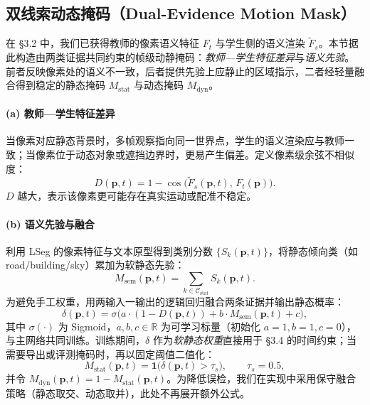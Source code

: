 \documentclass[10pt,conference]{IEEEtran} %
\begin{document}
\subsection{双线索动态掩码（Dual\mbox{-}Evidence Motion Mask）}
在 §3.2 中，我们已获得教师的像素语义特征 $F_t$ 与学生侧的语义渲染 $\tilde F_s$。本节据此构造由两类证据共同约束的帧级动静掩码：\emph{教师—学生特征差异}与\emph{语义先验}。前者反映像素处的语义不一致，后者提供先验上应静止的区域指示，二者经轻量融合得到稳定的静态掩码 $M_{\mathrm{stat}}$ 与动态掩码 $M_{\mathrm{dyn}}$。

\paragraph{(a) 教师—学生特征差异}
当像素对应静态背景时，多帧观察指向同一世界点，学生的语义渲染应与教师一致；当像素位于动态对象或遮挡边界时，更易产生偏差。定义像素级余弦不相似度：
\begin{equation}
D(\mathbf p,t)=1-\cos\!\big(\tilde F_s(\mathbf p,t),\,F_t(\mathbf p)\big).
\end{equation}
$D$ 越大，表示该像素更可能存在真实运动或配准不稳定。

\paragraph{(b) 语义先验与融合}
利用 LSeg 的像素特征与文本原型得到类别分数 $\{S_k(\mathbf p,t)\}$，将静态倾向类（如 road/building/sky）累加为软静态先验：
\begin{equation}
M_{\mathrm{sem}}(\mathbf p,t)=\sum_{k\in\mathcal C_{\mathrm{stat}}}S_k(\mathbf p,t).
\label{eq:demm_sem}
\end{equation}
为避免手工权重，用两输入一输出的逻辑回归融合两条证据并输出静态概率：
\begin{equation}
\delta(\mathbf p,t)=\sigma\!\big(a\cdot(1-D(\mathbf p,t))+b\cdot M_{\mathrm{sem}}(\mathbf p,t)+c\big),
\label{eq:demm_delta_final}
\end{equation}
其中 $\sigma(\cdot)$ 为 Sigmoid，$a,b,c\in\mathbb{R}$ 为可学习标量（初始化 $a{=}1,b{=}1,c{=}0$），与主网络共同训练。训练期间，$\delta$ 作为\emph{软静态权重}直接用于 §3.4 的时间约束；当需要导出或评测掩码时，再以固定阈值二值化：
\begin{equation}
M_{\mathrm{stat}}(\mathbf p,t)=\mathbf{1}\!\big(\delta(\mathbf p,t)>\tau_s\big),\qquad \tau_s=0.5,
\end{equation}
并令 $M_{\mathrm{dyn}}(\mathbf p,t)=1-M_{\mathrm{stat}}(\mathbf p,t)$。为降低误检，我们在实现中采用保守融合策略（静态取交、动态取并），此处不再展开额外公式。
\end{document}

